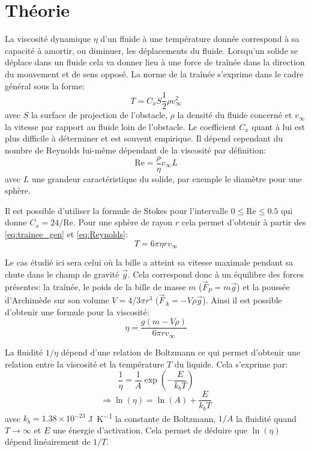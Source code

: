 \section{Théorie}
La viscosité dynamique $\eta$ d'un fluide à une température donnée correspond à sa capacité à amortir, ou diminuer, les déplacements du fluide. Lorsqu'un solide se déplace dans un fluide cela va donner lieu à une force de traînée dans la direction du mouvement et de sens opposé. La norme de la traînée s'exprime dans le cadre général sous la forme:
\begin{equation}
    T = C_x S \frac{1}{2} \rho v_\infty ^2
    \label{eq:trainee_gen}
\end{equation}
avec $S$ la surface de projection de l'obstacle, $\rho$ la densité du fluide concerné et \(v_\infty\) la vitesse par rapport au fluide loin de l'obstacle. Le coefficient $C_x$ quant à lui est plus difficile à déterminer et est souvent empirique. Il dépend cependant du nombre de Reynolds lui-même dépendant de la viscosité par définition:
\begin{equation}
    \mathrm{Re} = \frac{\rho}{\eta}v_\infty L
    \label{eq:Reynolds}
\end{equation}
avec $L$ une grandeur caractéristique du solide, par exemple le diamètre pour une sphère.

Il est possible d'utiliser la formule de Stokes pour l'intervalle $0 \leq \mathrm{Re} \leq 0.5$ qui donne \hbox{$C_x = 24/\mathrm{Re}$}. Pour une sphère de rayon $r$ cela permet d'obtenir à partir des \autoref{eq:trainee_gen} et \autoref{eq:Reynolds}:
\begin{equation}
    T = 6 \pi \eta r v_\infty
    \label{eq:trainee_stokes}
\end{equation}

Le cas étudié ici sera celui où la bille a atteint sa vitesse maximale pendant sa chute dans le champ de gravité $\vec{g}$. Cela correspond donc à un équilibre des forces présentes: la traînée, le poids de la bille de masse $m$ ($\vec{F}_P = m\vec{g}$) et la poussée d'Archimède sur son volume $V = 4/3 \pi r^3$ ($\vec{F}_A = -V \rho \vec{g}$). Ainsi il est possible d'obtenir une formule pour la viscosité:
\begin{equation}
    \eta = \frac{g(m-V \rho)}{6\pi r v_\infty}
    \label{eq:viscosite}
\end{equation}

La fluidité $1/\eta$ dépend d'une relation de Boltzmann ce qui permet d'obtenir une relation entre la viscosité et la température $T$ du liquide. Cela s'exprime par:
\begin{equation}
    \frac{1}{\eta} = \frac{1}{A} \exp\left(-\frac{E}{k_b T}\right)
\end{equation}
\begin{equation}
    \Rightarrow \ln(\eta) = \ln(A) + \frac{E}{k_b T}
    \label{eq:ln_relation_boltzmann}
\end{equation}
avec $k_b = 1.38 \times 10^{-23}$ \si{\joule \per \kelvin} la constante de Boltzmann, $1/A$ la fluidité quand $T \to \infty$ et $E$ une énergie d'activation. Cela permet de déduire que $\ln(\eta)$ dépend linéairement de $1/T$.

